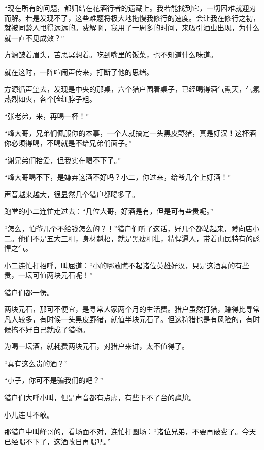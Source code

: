 
\begin{this_body}



“现在所有的问题，都归结在花酒行者的遗藏上。我若能找到它，一切困难就迎刃而解。若是发现不了，这些难题将极大地拖慢我修行的速度。会让我在修行之初，就被同龄人甩得远远的。费解啊，我用了一周多的时间，来吸引酒虫出现，为什么就一直不见成效？”

方源皱着眉头，苦思冥想着。吃到嘴里的饭菜，也不知道什么味道。

就在这时，一阵喧闹声传来，打断了他的思绪。

方源循声望去，发现是中央的那桌，六个猎户围着桌子，已经喝得酒气熏天，气氛热烈如火，各个脸红脖子粗。

“张老弟，来，再喝一杯！”

“峰大哥，兄弟们佩服你的本事，一个人就搞定一头黑皮野猪，真是好汉！这杯酒你必须得喝，不喝就是不给兄弟们面子。”

“谢兄弟们抬爱，但我实在喝不下了。”

“峰大哥喝不下，是嫌弃这酒不好吗？小二，你过来，给爷几个上好酒！”

声音越来越大，很显然几个猎户都喝多了。

跑堂的小二连忙走过去：“几位大哥，好酒是有，但是可有些贵呢。”

“怎么，怕爷几个不给钱怎么的？！”猎户们听了这话，好几个都站起来，瞪向店小二。他们不是五大三粗，身材魁梧，就是黑瘦粗壮，精悍逼人，带着山民特有的彪悍之气。

小二连忙打招呼，叫屈道：“小的哪敢瞧不起诸位英雄好汉，只是这酒真的有些贵，一坛可值两块元石呢！”

猎户们都一愣。

两块元石，那可不便宜，是寻常人家两个月的生活费。猎户虽然打猎，赚得比寻常凡人较多，有时候一头黑皮野猪，就值半块元石了。但这狩猎也是有风险的，有时候搞不好自己就成了猎物。

为喝一坛酒，就耗费两块元石，对猎户来讲，太不值得了。

“真有这么贵的酒？”

“小子，你可不是骗我们的吧？”

猎户们大呼小叫，但是声音都有点虚，有些下不了台的尴尬。

小儿连叫不敢。

那猎户中叫峰哥的，看场面不对，连忙打圆场：“诸位兄弟，不要再破费了。今天已经喝不下了，这酒改日再喝吧。”


\end{this_body}

